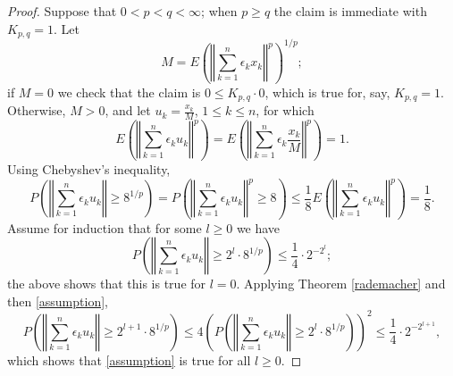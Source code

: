 \documentclass{article}
\newcommand{\norm}[1]{\left\Vert #1 \right\Vert}
\theoremstyle{definition}
\begin{document}
\begin{proof}
Suppose that $0<p<q<\infty$; when $p \geq q$ the claim is immediate with $K_{p,q}=1$. Let
\[
M = E\left(\norm{\sum_{k=1}^n \epsilon_k x_k}^p\right)^{1/p};
\]
if $M=0$ we check that the claim is $0 \leq K_{p,q}\cdot 0$, which is true for, say, $K_{p,q}=1$. Otherwise, $M>0$,
and
let $u_k=\frac{x_k}{M}$, $1 \leq k \leq n$, for which
\begin{equation}
E\left(\norm{\sum_{k=1}^n \epsilon_k u_k}^p \right) = 
E\left(\norm{\sum_{k=1}^n \epsilon_k \frac{x_k}{M}}^p \right) 
= 1.
\label{normalized}
\end{equation}
Using Chebyshev's inequality,
\[
P\left( \norm{\sum_{k=1}^n \epsilon_k u_k} \geq 8^{1/p} \right)
=P\left( \norm{\sum_{k=1}^n \epsilon_k u_k}^p \geq 8 \right)
\leq \frac{1}{8} E\left(\norm{\sum_{k=1}^n \epsilon_k u_k}^p\right)
= \frac{1}{8}.
\]
Assume for induction that for some $l \geq 0$ we have 
\begin{equation}
P\left( \norm{\sum_{k=1}^n \epsilon_k u_k} \geq 2^l \cdot 8^{1/p} \right) 
\leq \frac{1}{4} \cdot 2^{-2^l};
\label{assumption}
\end{equation}
the above shows that this is true for $l=0$. Applying Theorem \ref{rademacher} and then \eqref{assumption},
\[
P\left( \norm{\sum_{k=1}^n \epsilon_k u_k} \geq 2^{l+1} \cdot 8^{1/p} \right) 
\leq 4\left(P\left( \norm{\sum_{k=1}^n \epsilon_k u_k} \geq 2^l \cdot 8^{1/p} \right)\right)^2
\leq \frac{1}{4} \cdot 2^{-2^{l+1}},
\]
which shows that \eqref{assumption} is true for all $l \geq 0$. 


\end{proof}
\end{document}
